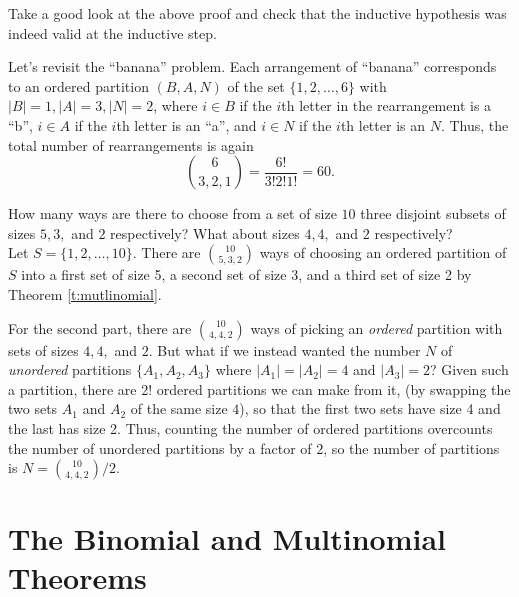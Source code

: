\documentclass[11pt,dvipsnames]{book}
\numberwithin{figure}{section} %
\numberwithin{table}{section} %
\begin{document}
Take a good look at the above proof and check that the inductive hypothesis was indeed valid at the inductive step.

\begin{example}
Let's revisit the ``banana'' problem. Each arrangement of ``banana'' corresponds to an ordered partition $(B,A,N)$ of the set $\{1,2, \dots ,6\}$ with $|B|=1,|A|=3,|N|=2$, where $i\in B$ if the $i$th letter in the rearrangement is a ``b'', $i\in A$ if the $i$th letter is an ``a'', and $i\in N$ if the $i$th letter is an $N$. Thus, the total number of rearrangements is again
\[
{6 \choose 3 , 2, 1} = \frac{6!}{3!2!1!}=60.
\]
\end{example}

\begin{example}
How many ways are there to choose from a set of size $10$ three disjoint subsets of sizes $5,3,$ and $2$ respectively? What about sizes $4,4,$ and $2$ respectively? \\

Let $S=\{1,2,\dots,10\}$. There are ${10\choose 5,3,2}$ ways of choosing an ordered partition of $S$ into a first set of size 5, a second set of size 3, and a third set of size 2 by Theorem \ref{t:mutlinomial}.


For the second part, there are ${10\choose 4,4,2}$ ways of picking an {\it ordered} partition with sets of sizes $4,4,$ and $2$. But what if we instead wanted the number $N$ of {\it unordered} partitions $\{A_{1},A_{2},A_{3}\}$ where $|A_{1}|=|A_{2}|=4$ and $|A_{3}|=2$? Given such a partition, there are $2!$ ordered partitions we can make from it, (by swapping the two sets $A_1$ and $A_2$ of the same size $4$), so that the first two sets have size 4 and the last has size 2.
Thus, counting the number of ordered partitions overcounts the number of unordered partitions by a factor of $2$, so the number of partitions is $N= {10\choose 4,4,2}/2$.

\end{example}

\section{The Binomial and Multinomial Theorems}%
\label{binomialmultinomial}
\end{document}
